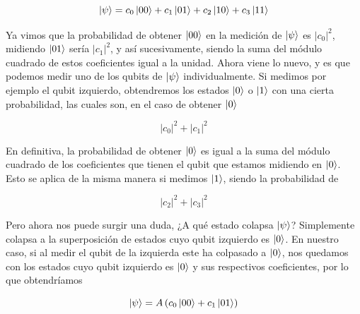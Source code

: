 \documentclass{article}
\numberwithin{equation}{section} %
\begin{document}
    \begin{equation*}
        \ket{\psi} = c_{0} \ket{0 0} + c_{1} \ket{0 1} + c_{2} \ket{1 0} + c_{3} \ket{1 1}
    \end{equation*}

    \vspace{2.5mm}

    Ya vimos que la probabilidad de obtener \( \ket{0 0} \) en la medición de \( \ket{\psi} \) es \( | c_{0} |^{2} \), midiendo \( \ket{0 1} \) sería \( | c_{1} |^{2} \), y así sucesivamente, siendo la suma del módulo cuadrado de estos coeficientes igual a la unidad. Ahora viene lo nuevo, y es que podemos medir uno de los qubits de \( \ket{\psi} \) individualmente. Si medimos por ejemplo el qubit izquierdo, obtendremos los estados \( \ket{0} \) o \( \ket{1} \) con una cierta probabilidad, las cuales son, en el caso de obtener \( \ket{0} \) 

    \begin{equation*}
        | c_{0} |^{2} + | c_{1} |^{2}
    \end{equation*}

    \vspace{2.5mm}

    En definitiva, la probabilidad de obtener \( \ket{0} \) es igual a la suma del módulo cuadrado de los coeficientes que tienen el qubit que estamos midiendo en \( \ket{0} \). Esto se aplica de la misma manera si medimos \( \ket{1} \), siendo la probabilidad de

    \begin{equation*}
        | c_{2} |^{2} + | c_{3} |^{2}
    \end{equation*}

    \vspace{2.5mm}

    Pero ahora nos puede surgir una duda, ¿A qué estado colapsa \( \ket{\psi} \)? Simplemente colapsa a la superposición de estados cuyo qubit izquierdo es \( \ket{0} \). En nuestro caso, si al medir el qubit de la izquierda este ha colpasado a \( \ket{0} \), nos quedamos con los estados cuyo qubit izquierdo es \( \ket{0} \) y sus respectivos coeficientes, por lo que obtendríamos
    
    \begin{equation*}
        \ket{\psi} = A \left( c_{0} \ket{0 0} + c_{1} \ket{0 1} \right)
    \end{equation*}

    \vspace{2.5mm}
\end{document}
